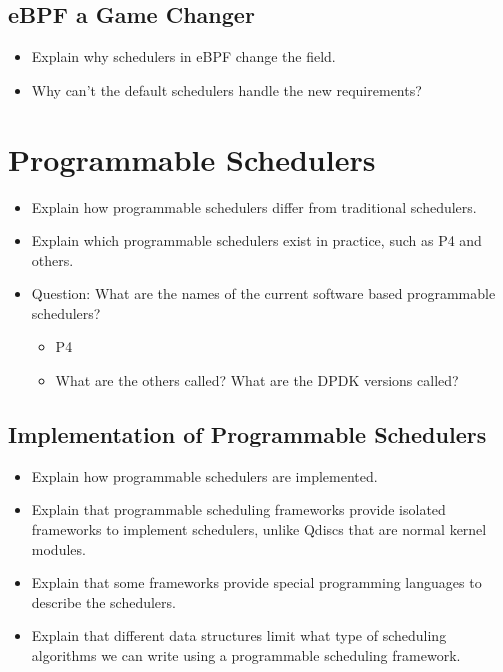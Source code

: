 \documentclass[sigconf, nonacm]{acmart}
\begin{document}
\subsection{eBPF a Game Changer}

\begin{itemize}
  \item Explain why schedulers in eBPF change the field.
  \item Why can't the default schedulers handle the new requirements?
\end{itemize}


\section{Programmable Schedulers}

\begin{itemize}
  \item Explain how programmable schedulers differ from traditional schedulers.
  \item Explain which programmable schedulers exist in practice, such as P4 and others.
  \item Question: What are the names of the current software based programmable schedulers?
        \begin{itemize}
          \item P4
          \item What are the others called? What are the DPDK versions called?
        \end{itemize}
\end{itemize}



\subsection{Implementation of Programmable Schedulers}

\begin{itemize}
  \item Explain how programmable schedulers are implemented.
  \item Explain that programmable scheduling frameworks provide isolated frameworks to implement schedulers, unlike Qdiscs that are normal kernel modules.
  \item Explain that some frameworks provide special programming languages to describe the schedulers.
  \item Explain that different data structures limit what type of scheduling algorithms we can write using a programmable scheduling framework.
\end{itemize}
\end{document}

